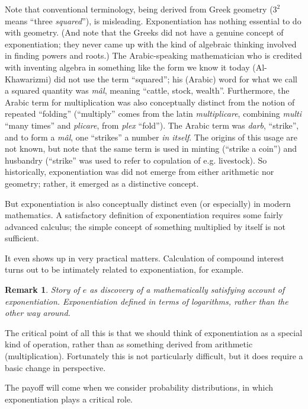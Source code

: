 \documentclass[reqno,12pt]{tufte-book}
\numberwithin{equation}{subsection}
\newtheorem{remark}{Remark}
\begin{document}
Note that conventional terminology, being derived from Greek geometry
($3^2$ means ``three \textit{squared}''), is misleading.
Exponentiation has nothing essential to do with geometry.  (And note
that the Greeks did not have a genuine concept of exponentiation; they
never came up with the kind of algebraic thinking involved in finding
powers and roots.)  The Arabic-speaking mathematician who is credited
with inventing algebra in something like the form we know it today
(Al-Khawarizmi) did not use the term ``squared''; his (Arabic) word
for what we call a squared quantity was \textit{m\^{a}l}, meaning
``cattle, stock, wealth''.  Furthermore, the Arabic term for
multiplication was also conceptually distinct from the notion of
repeated ``folding'' (``multiply'' comes from the latin
\textit{multiplicare}, combining \textit{multi} ``many times'' and
\textit{plicare}, from \textit{plex} ``fold'').  The Arabic term was
\textit{darb}, ``strike'', and to form a \textit{m\^{a}l}, one
``strikes'' a number \textit{in itself}.  The origins of this usage
are not known, but note that the same term is used in minting
(``strike a coin'') and husbandry (``strike'' was used to refer to
copulation of e.g. livestock).  So historically, exponentiation was
did not emerge from either arithmetic nor geometry; rather, it emerged
as a distinctive concept.

But exponentiation is also conceptually distinct even (or especially)
in modern mathematics.  A satisfactory definition of exponentiation
requires some fairly advanced calculus; the simple concept of
something multiplied by itself is not sufficient.

It even shows up in very practical matters.  Calculation of compound
interest turns out to be intimately related to exponentiation, for
example.

\begin{remark}
  Story of $e$ as discovery of a mathematically satisfying account of
  exponentiation.  Exponentiation defined in terms of logarithms,
  rather than the other way around.
\end{remark}

The critical point of all this is that we should think of
exponentiation as a special kind of operation, rather than as
something derived from arithmetic (multiplication).  Fortunately this
is not particularly difficult, but it does require a basic change in
perspective.

The payoff will come when we consider probability distributions, in
which exponentiation plays a critical role.
\end{document}

